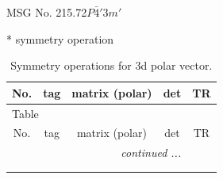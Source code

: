 \documentclass[fleqn,8pt]{jsarticle}
\begin{document}
\setcounter{MaxMatrixCols}{32}

\renewcommand{\tablename}{Table~}
\renewcommand{\figurename}{Figure~}
\begin{center}
\LARGE
MSG No. 215.72\quad$P\bar{4}'3m'$
\end{center}
* symmetry operation
\renewcommand{\arraystretch}{1.3}
\begin{longtable}{ccccc}
\caption{Symmetry operations for 3d polar vector.}
 \\
 \hline \hline
No. & tag & matrix (polar) & det & TR \\ \hline \endfirsthead

\multicolumn{4}{l}{\tablename\ \thetable{}} \\
 \hline \hline
No. & tag & matrix (polar) & det & TR \\ \hline \endhead

 \hline \hline
\multicolumn{4}{r}{\footnotesize\it continued ...} \\ \endfoot

 \hline \hline
\multicolumn{4}{r}{} \\ \endlastfoot


\end{longtable}
\end{document}
